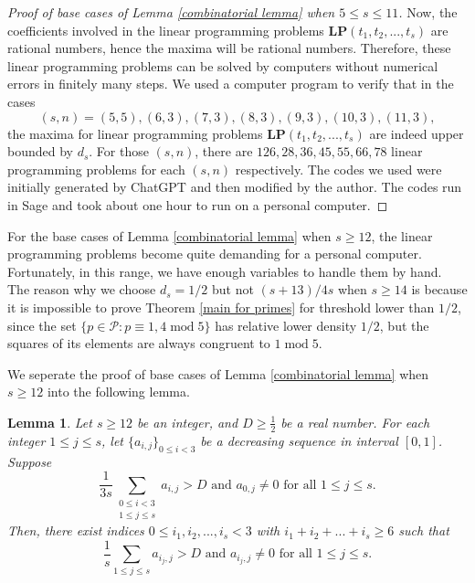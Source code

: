 \documentclass[11pt]{amsart}
\theoremstyle{plain} %
\newtheorem{lem}[thm]{Lemma}
\theoremstyle{remark}
\numberwithin{equation}{section}
\begin{document}
\begin{proof}[Proof of base cases of Lemma \ref{combinatorial lemma} when $5\leq s\leq 11$]
    Now, the coefficients involved in the linear programming problems \textbf{LP}$(t_1,t_2,...,t_s)$ are rational numbers, hence the maxima will be rational numbers. Therefore, these linear programming problems can be solved by computers without numerical errors in finitely many steps. We used a computer program to verify that in the cases
    \begin{equation*}
        (s,n)=(5,5),(6,3),(7,3),(8,3),(9,3),(10,3),(11,3),
    \end{equation*}
    the maxima for linear programming problems \textbf{LP}$(t_1,t_2,...,t_s)$ are indeed upper bounded by $d_s$. For those $(s,n)$, there are $126,28,36,45,55,66,78$ linear programming problems for each $(s,n)$ respectively. The codes we used were initially generated by ChatGPT and then modified by the author. The codes run in Sage and took about one hour to run on a personal computer.
\end{proof}

For the base cases of Lemma \ref{combinatorial lemma} when $s\geq 12$, the linear programming problems become quite demanding for a personal computer. Fortunately, in this range, we have enough variables to handle them by hand. The reason why we choose $d_s=1/2$ but not $(s+13)/4s$ when $s\geq 14$ is because it is impossible to prove Theorem \ref{main for primes} for threshold lower than $1/2$, since the set $\{p\in \mathcal{P}:p\equiv 1,4\;\mathrm{mod}\;5\}$ has relative lower density $1/2$, but the squares of its elements are always congruent to $1\;\mathrm{mod}\;5$.

We seperate the proof of base cases of Lemma \ref{combinatorial lemma} when $s\geq 12$ into the following lemma.

\begin{lem}\label{lemma for base cases}
    Let $s\geq 12$ be an integer, and $D\geq \frac{1}{2}$ be a real number. For each integer $1\leq j\leq s$, let $\{a_{i,j}\}_{0\leq i<3}$ be a decreasing sequence in interval $[0,1]$. Suppose 
    \begin{equation*}
        \text{$\frac{1}{3s}\sum_{\substack{0\leq i<3\\1\leq j\leq s}}a_{i,j}>D$ and $a_{0,j}\neq 0$ for all $1\leq j\leq s$.}
    \end{equation*}
    Then, there exist indices $0\leq i_1,i_2,...,i_s<3$ with $i_1+i_2+...+i_s\geq 6$ such that
    \begin{equation*}
        \text{$\frac{1}{s}\sum_{1\leq j\leq s}a_{i_j,j}>D$ and $a_{i_j,j}\neq 0$ for all $1\leq j\leq s$.}
    \end{equation*}
\end{lem}
\end{document}
